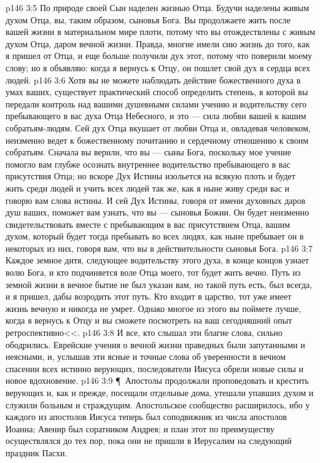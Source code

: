 \vs p146 3:5 По природе своей Сын наделен жизнью Отца. Будучи наделены живым духом Отца, вы, таким образом, сыновья Бога. Вы продолжаете жить после вашей жизни в материальном мире плоти, потому что вы отождествлены с живым духом Отца, даром вечной жизни. Правда, многие имели сию жизнь до того, как я пришел от Отца, и еще больше получили дух этот, потому что поверили моему слову; но я объявляю: когда я вернусь к Отцу, он пошлет свой дух в сердца всех людей.
\vs p146 3:6 Хотя вы не можете наблюдать действие божественного духа в умах ваших, существует практический способ определить степень, в которой вы передали контроль над вашими душевными силами учению и водительству сего пребывающего в вас духа Отца Небесного, и это --- сила любви вашей к вашим собратьям\hyp{}людям. Сей дух Отца вкушает от любви Отца и, овладевая человеком, неизменно ведет к божественному почитанию и сердечному отношению к своим собратьям. Сначала вы верили, что вы --- сыны Бога, поскольку мое учение помогло вам глубже осознать внутреннее водительство пребывающего в вас присутствия Отца; но вскоре Дух Истины изольется на всякую плоть и будет жить среди людей и учить всех людей так же, как я ныне живу среди вас и говорю вам слова истины. И сей Дух Истины, говоря от имени духовных даров душ ваших, поможет вам узнать, что вы --- сыновья Божии. Он будет неизменно свидетельствовать вместе с пребывающим в вас присутствием Отца, вашим духом, который будет тогда пребывать во всех людях, как ныне пребывает он в некоторых из них, говоря вам, что вы в действительности сыновья Бога.
\vs p146 3:7 Каждое земное дитя, следующее водительству этого духа, в конце концов узнает волю Бога, и кто подчиняется воле Отца моего, тот будет жить вечно. Путь из земной жизни в вечное бытие не был указан вам, но такой путь есть, был всегда, и я пришел, дабы возродить этот путь. Кто входит в царство, тот уже имеет жизнь вечную и никогда не умрет. Однако многое из этого вы поймете лучше, когда я вернусь к Отцу и вы сможете посмотреть на ваш сегодняшний опыт ретроспективно<<.
\vs p146 3:8 И все, кто слышал эти благие слова, сильно ободрились. Еврейские учения о вечной жизни праведных были запутанными и неясными, и, услышав эти ясные и точные слова об уверенности в вечном спасении всех истинно верующих, последователи Иисуса обрели новые силы и новое вдохновение.
\vs p146 3:9 \P\ Апостолы продолжали проповедовать и крестить верующих и, как и прежде, посещали отдельные дома, утешали упавших духом и служили больным и страждущим. Апостольское сообщество расширилось, ибо у каждого из апостолов Иисуса теперь был соподвижник из числа апостолов Иоанна; Авенир был соратником Андрея; и план этот по преимуществу осуществлялся до тех пор, пока они не пришли в Иерусалим на следующий праздник Пасхи.
